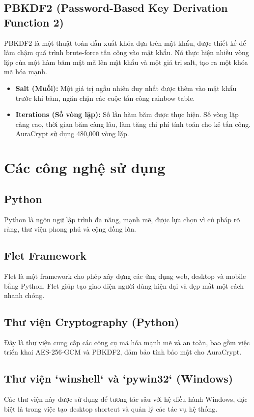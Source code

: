 \subsection{PBKDF2 (Password-Based Key Derivation Function 2)}
PBKDF2 là một thuật toán dẫn xuất khóa dựa trên mật khẩu, được thiết kế để làm chậm quá trình brute-force tấn công vào mật khẩu. Nó thực hiện nhiều vòng lặp của một hàm băm mật mã lên mật khẩu và một giá trị salt, tạo ra một khóa mã hóa mạnh.
\begin{itemize}
    \item \textbf{Salt (Muối):} Một giá trị ngẫu nhiên duy nhất được thêm vào mật khẩu trước khi băm, ngăn chặn các cuộc tấn công rainbow table.
    \item \textbf{Iterations (Số vòng lặp):} Số lần hàm băm được thực hiện. Số vòng lặp càng cao, thời gian băm càng lâu, làm tăng chi phí tính toán cho kẻ tấn công. AuraCrypt sử dụng 480,000 vòng lặp.
\end{itemize}

\section{Các công nghệ sử dụng}
\subsection{Python}
Python là ngôn ngữ lập trình đa năng, mạnh mẽ, được lựa chọn vì cú pháp rõ ràng, thư viện phong phú và cộng đồng lớn.
\subsection{Flet Framework}
Flet là một framework cho phép xây dựng các ứng dụng web, desktop và mobile bằng Python. Flet giúp tạo giao diện người dùng hiện đại và đẹp mắt một cách nhanh chóng.
\subsection{Thư viện Cryptography (Python)}
Đây là thư viện cung cấp các công cụ mã hóa mạnh mẽ và an toàn, bao gồm việc triển khai AES-256-GCM và PBKDF2, đảm bảo tính bảo mật cho AuraCrypt.
\subsection{Thư viện `winshell` và `pywin32` (Windows)}
Các thư viện này được sử dụng để tương tác sâu với hệ điều hành Windows, đặc biệt là trong việc tạo desktop shortcut và quản lý các tác vụ hệ thống.
\newpage